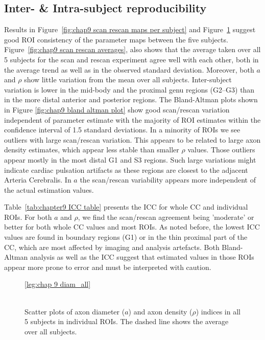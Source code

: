 \subsection{Inter- \& Intra-subject reproducibility}
Results in Figure~\ref{fig:chap9 scan rescan maps per subject} and  Figure~\ref{fig:chap9 scan rescan scatterplots per subject} suggest good \gls{ROI} consistency of the parameter maps between the five subjects. Figure~\ref{fig:chap9 scan rescan averages}, also shows that the average taken over all 5 subjects for the scan and rescan experiment agree well with each other, both in the average trend as well as in the observed standard deviation. Moreover, both $a$ and $\rho$ show little variation from the mean over all subjects. Inter-subject variation is lower in the mid-body and the proximal genu regions (G2--G3) than in the more distal anterior and posterior regions. The Bland-Altman plots shown in Figure \ref{fig:chap9 bland altman plot} show good scan/rescan variation independent of parameter estimate with the majority of \gls{ROI} estimates within the confidence interval of 1.5 standard deviations. In a minority of \gls{ROI}s we see outliers with large scan/rescan variation. This appears to be related to large axon density estimates, which appear less stable than smaller $\rho$ values. Those outliers appear mostly in the most distal G1 and S3 regions. Such large variations might indicate cardiac pulsation artifacts as these regions are closest to the adjacent Arteria Cerebralis. In $a$ the scan/rescan variability appears more independent of the actual estimation values.


Table~\ref{tab:chapter9 ICC table} presents the \gls{ICC} for whole \gls{CC} and individual \gls{ROI}s. For both $a$ and $\rho$, we find the scan/rescan agreement being 'moderate' or better for both whole \gls{CC} values and most \gls{ROI}s. As noted before, the lowest ICC values are found in boundary regions (G1) or in the thin proximal part of the \gls{CC}, which are most affected by imaging and analysis artefacts. Both Bland-Altman analysis as well as the ICC suggest that estimated values in those \gls{ROI}s appear more prone to error and must be interpreted with caution.

\begin{figure}[ht]
	\centering
	\ref{leg:chap 9 diam_all}
	\\	
	\\
	\caption{Scatter plots of axon diameter ($a$) and axon density ($\rho$) indices in all 5 subjects in individual \gls{ROI}s. The dashed line shows the average over all subjects.}
	\label{fig:chap9 scan rescan scatterplots per subject}
\end{figure}

